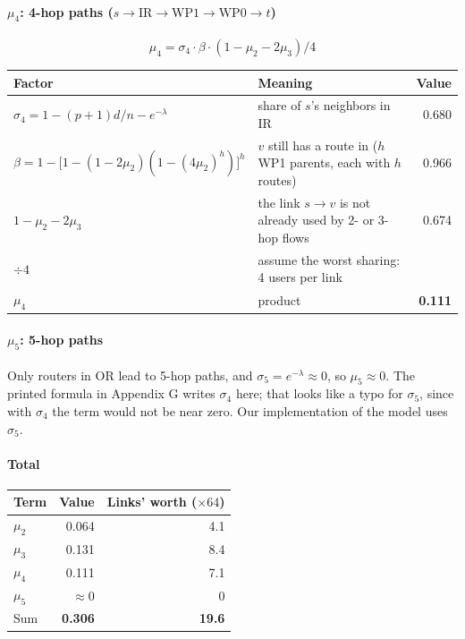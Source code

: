 \paragraph{$\mu_4$: 4-hop paths ($s \to \text{IR} \to \text{WP1} \to \text{WP0} \to t$)}

\[
\mu_4 = \sigma_4 \cdot \beta \cdot (1 - \mu_2 - 2\mu_3) / 4
\]

\begin{center}
\begin{tabularx}{\linewidth}{@{}l L r@{}}
\toprule
Factor & Meaning & Value \\
\midrule
$\sigma_4 = 1 - (p+1)d/n - e^{-\lambda}$ & share of $s$'s neighbors in IR & 0.680 \\
$\beta = 1 - \big[1 - (1 - 2\mu_2)(1 - (4\mu_2)^h)\big]^h$ & $v$ still has a route in ($h$ WP1 parents, each with $h$ routes) & 0.966 \\
$1 - \mu_2 - 2\mu_3$ & the link $s \to v$ is not already used by 2- or 3-hop flows & 0.674 \\
$\div 4$ & assume the worst sharing: 4 users per link & \\
$\mu_4$ & product & \textbf{0.111} \\
\bottomrule
\end{tabularx}
\end{center}

\paragraph{$\mu_5$: 5-hop paths}

Only routers in OR lead to 5-hop paths, and $\sigma_5 = e^{-\lambda} \approx 0$, so $\mu_5 \approx 0$. The printed formula in Appendix G writes $\sigma_4$ here; that looks like a typo for $\sigma_5$, since with $\sigma_4$ the term would not be near zero. Our implementation of the model uses $\sigma_5$.

\paragraph{Total}

\begin{center}
\begin{tabular}{@{}lrr@{}}
\toprule
Term & Value & Links' worth ($\times 64$) \\
\midrule
$\mu_2$ & 0.064 & 4.1 \\
$\mu_3$ & 0.131 & 8.4 \\
$\mu_4$ & 0.111 & 7.1 \\
$\mu_5$ & $\approx 0$ & 0 \\
\midrule
Sum & \textbf{0.306} & \textbf{19.6} \\
\bottomrule
\end{tabular}
\end{center}

